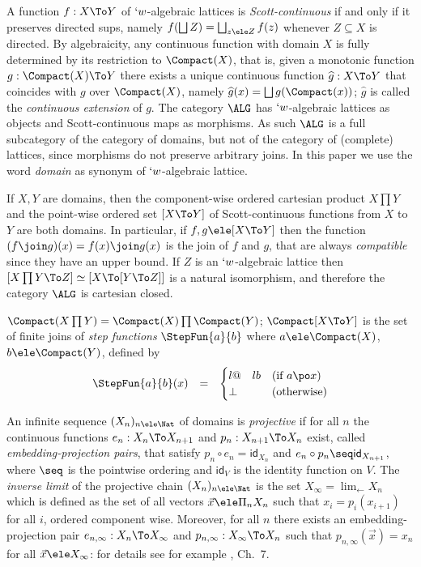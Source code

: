 \documentclass{lmcs}
\def\ie{\emph{i.e.}}
\newcommand{\vect}[1]{\vec{#1}}
\begin{document}
A function $f:X\To Y$ of $`w$-algebraic lattices is \emph{Scott-continuous} if and only if it preserves directed sups, namely $f(\bigsqcup Z) = \bigsqcup_{z\ele Z}f(z)$ whenever $Z\subseteq X$ is directed. 
By algebraicity, any continuous function with domain $X$ is fully determined by its restriction to $\Compact(X)$, that is, given a monotonic function $g:\Compact(X)\To Y$ there exists a unique continuous function $\widehat{g}:X\To Y$ that coincides with $g$ over $\Compact(X)$, namely $\widehat{g}(x) = \bigsqcup g(\Compact(x))$; $\widehat{g}$ is called the \emph{continuous extension} of $g$.
The category $\ALG$ has $`w$-algebraic lattices as objects and Scott-continuous maps as morphisms. 
As such $\ALG$ is a full subcategory of the category of domains, but not of the category of (complete) lattices, since morphisms do not preserve arbitrary joins. 
In this paper we use the word \emph{domain} as synonym of $`w$-algebraic lattice.

If $X,Y$ are domains, then the component-wise ordered cartesian product $X\prod Y$ and the point-wise ordered set $[X \To Y]$ of Scott-continuous functions from $X$ to $Y$ are both domains.
In particular, if $f,g \ele [X\To Y]$ then the function $(f\join g)(x) = f(x) \join g(x)$ is the join of $f$ and $g$, that are always \emph{compatible} since they have an upper bound.
If $Z$ is an $`w$-algebraic lattice then $[X\prod Y \To Z] \simeq [X \To [Y \To Z]]$ is a natural isomorphism, and therefore the category $\ALG$ is cartesian closed. 

$\Compact(X\prod Y) = \Compact(X)\prod \Compact(Y)$; %
$\Compact[X\To Y]$ is the set of finite joins of \emph{step functions} $\StepFun{a }{ b}$ where $a \ele \Compact(X)$, $b \ele \Compact(Y)$, defined by 
%
 \[ \begin{array}{rcl}
 \StepFun{a }{ b}(x) &=& 
 \begin{cases}{l@{\quad}l} b & (\textrm{if }a \po x) \\
 \bot & (\textrm{otherwise}) 
 \end{cases}
 \end{array} \]

An infinite sequence $(X_n)_{n\ele \Nat}$ of domains is \emph{projective} if for all $n$ the continuous functions $e_n:X_n \To X_{n+1}$ and $p_n:X_{n+1}\To X_n$ exist, called \emph{embedding-projection pairs}, that satisfy $p_n \circ e_n = \textsf{id}_{X_n}$ and $e_n \circ p_n \seq \textsf{id}_{X_{n+1}}$, where $\seq$ is the pointwise ordering and $ \textsf{id}_V $ is the identity function on $V$. 
The \emph{inverse limit} of the projective chain $(X_n)_{n\ele \Nat}$ is the set $X_\infty = \lim_\leftarrow X_n$ which is defined as the set of all vectors $\vect{x} \ele \Pi_n X_n$ such that $x_i = p_i(x_{i+1})$ for all $i$, ordered component wise. 
Moreover, for all $n$ there exists an embedding-projection pair $e_{n,\infty}:X_n\To X_\infty$ and $p_{n,\infty}:X_\infty\To X_n$ such that $p_{n,\infty}(\vect{x}) = x_n$ for all $\vect{x}\ele X_\infty$: for details see for example \cite{Amadio-Curien'98}, Ch.~7. 
\end{document}
